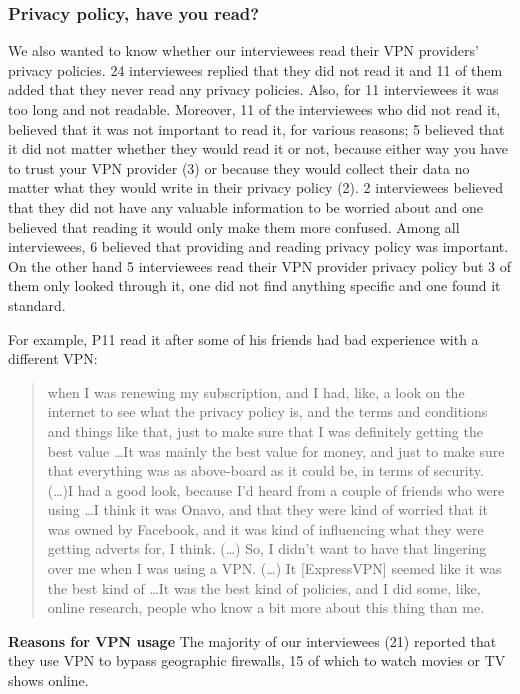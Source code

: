 \subsubsection{Privacy policy, have you read?} We also wanted to know whether
our interviewees read their VPN providers’ privacy policies. 24 interviewees
replied that they did not read it and 11 of them added that they never read
any privacy policies. Also, for 11 interviewees it was too long and not
readable. Moreover, 11 of the interviewees who did not read it, believed that
it was not important to read it, for various reasons; 5 believed that it did
not matter whether they would read it or not, because either way you have to
trust your VPN provider (3) or because they would collect their data no matter
what they would write in their privacy policy (2). 2 interviewees believed
that they did not have any valuable information to be worried about and one
believed that reading it would only make them more confused. Among all
interviewees, 6 believed that providing and reading privacy policy was
important. On the other hand 5 interviewees read their VPN provider privacy
policy but 3 of them only looked through it, one did not find anything
specific and one found it standard. 

For example, P11 read it after some of his friends had bad experience with a
different VPN: \begin{quote}when I was renewing my subscription, and I had,
like, a look on the internet to see what the privacy policy is, and the terms
and conditions and things like that, just to make sure that I was definitely
getting the best value \dots It was mainly the best value for money, and just
to make sure that everything was as above-board as it could be, in terms of
security. (\dots)I had a good look, because I'd heard from a couple of friends
who were using \dots I think it was Onavo, and that they were kind of worried
that it was owned by Facebook, and it was kind of influencing what they were
getting adverts for, I think. (\dots) So, I didn't want to have that lingering
over me when I was using a VPN. (\dots) It [ExpressVPN] seemed like it was the
best kind of \dots It was the best kind of policies, and I did some, like,
online research, people who know a bit more about this thing than
me.\end{quote}

\textbf{Reasons for VPN usage} The majority of our interviewees (21) reported
that they use VPN to bypass geographic firewalls, 15 of which to watch movies
or TV shows online.  

